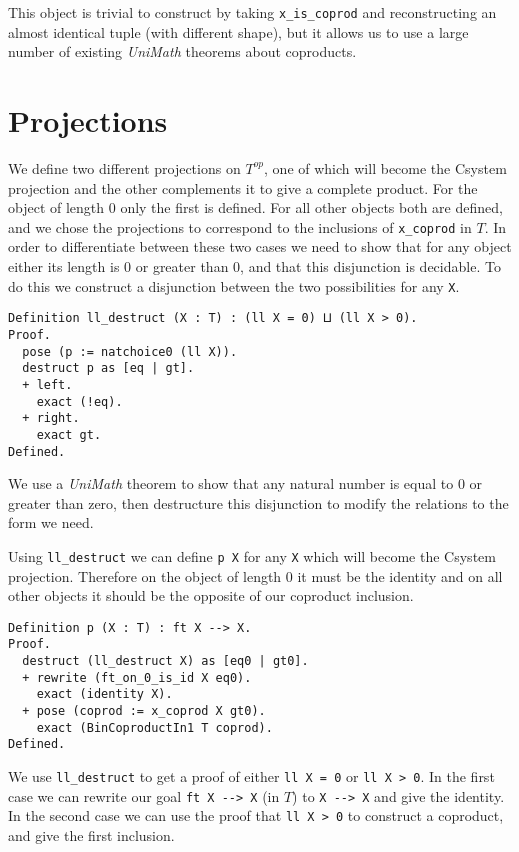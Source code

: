 This object is trivial to construct by taking \lstinline|x_is_coprod| and
reconstructing an almost identical tuple (with different shape), but it allows
us to use a large number of existing \textit{UniMath} theorems about coproducts.

\section{Projections}
We define two different projections on $T^{op}$, one of which will become the
Csystem projection and the other complements it to give a complete product. For
the object of length 0 only the first is defined. For all other objects both are
defined, and we chose the projections to correspond to the inclusions of
\lstinline|x_coprod| in $T$. In order to differentiate between these two cases
we need to show that for any object either its length is 0 or greater than 0,
and that this disjunction is decidable. To do this we construct a disjunction
between the two possibilities for any \lstinline|X|.

\begin{lstlisting}
Definition ll_destruct (X : T) : (ll X = 0) ⨿ (ll X > 0).
Proof.
  pose (p := natchoice0 (ll X)).
  destruct p as [eq | gt].
  + left.
    exact (!eq).
  + right.
    exact gt.
Defined.
\end{lstlisting}

We use a \textit{UniMath} theorem to show that any natural number is equal to 0
or greater than zero, then destructure this disjunction to modify the relations
to the form we need.

Using \lstinline|ll_destruct| we can define \lstinline|p X| for any
\lstinline|X| which will become the Csystem projection. Therefore on the object
of length 0 it must be the identity and on all other objects it should be the
opposite of our coproduct inclusion. 
\begin{lstlisting}
Definition p (X : T) : ft X --> X.
Proof.
  destruct (ll_destruct X) as [eq0 | gt0].
  + rewrite (ft_on_0_is_id X eq0).
    exact (identity X).
  + pose (coprod := x_coprod X gt0).
    exact (BinCoproductIn1 T coprod).
Defined.
\end{lstlisting}

We use \lstinline|ll_destruct| to get a proof of either \lstinline|ll X = 0| or
\lstinline|ll X > 0|. In the first case we can rewrite our goal 
\lstinline|ft X --> X| (in $T$) to \lstinline|X --> X| and give the identity. 
In the second case we can use the proof that \lstinline|ll X > 0| to construct 
a coproduct, and give the first inclusion.

